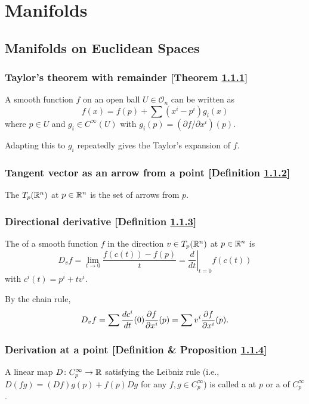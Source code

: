 \section{Manifolds}
\subsection{Manifolds on Euclidean Spaces}
\subsubsection{Taylor's theorem with remainder [Theorem \ref{taylors-theorem-with-remainder}]}\label{taylors-theorem-with-remainder}
A smooth function $f$ on an open ball $U \in \mathcal{O}_n$ can be written as
\[
f(x) = f(p) + \sum (x^i - p^i) g_i(x)
\]
where $p \in U$ and $g_i \in C^\infty (U)$ with $g_i(p) = (\partial f / \partial x^i)(p)$.

Adapting this to $g_i$ repeatedly gives the Taylor's expansion of $f$.

\subsubsection{Tangent vector as an arrow from a point [Definition \ref{tangent-vector-as-an-arrow-from-a-point}]}\label{tangent-vector-as-an-arrow-from-a-point}
The  $T_p (\mathbb{R}^n)$ at $p \in \mathbb{R}^n$ is the set of arrows from $p$.

\subsubsection{Directional derivative [Definition \ref{directional-derivative}]}\label{directional-derivative}
The  of a smooth function $f$ in the direction $v \in T_p(\mathbb{R}^n)$ at $p \in \mathbb{R}^n$ is
\[
D_v f = \lim_{t \to 0} \frac{f(c(t)) - f(p)}{t} = \left. \frac{d}{dt}\right|_{t=0} f(c(t))
\]
with $c^i(t) = p^i + tv^i$.

By the chain rule,
\[
D_v f = \sum \frac{dc^i}{dt}(0)\frac{\partial f}{\partial x^i}(p) = \sum v^i \frac{\partial f}{\partial x^i}(p).
\]

\subsubsection{Derivation at a point [Definition \& Proposition \ref{derivation-at-a-point}]}\label{derivation-at-a-point}
A linear map $D \colon C_p^\infty \to \mathbb{R}$ satisfying the Leibniz rule (i.e., $D(fg) = (D f)g(p) + f(p)D g$ for any $f, g \in C_p^\infty$) is called a  at $p$ or a  of $C_p^\infty$.

